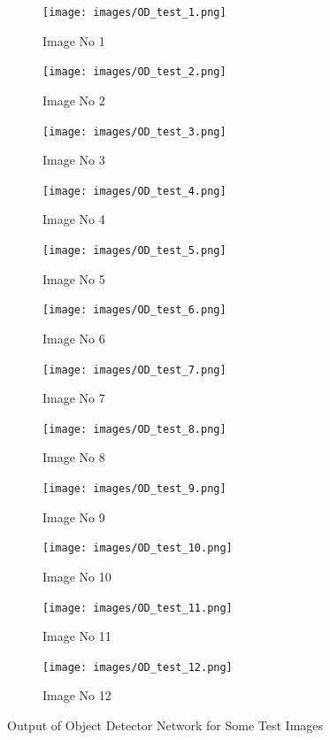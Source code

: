 \documentclass[a4paper, openany]{book}
\begin{document}
\begin{figure}[ht]
  \centering
  \begin{subfigure}[b]{0.3\linewidth}
    \texttt{[image: images/OD\_test\_1.png]}
    \caption{Image No 1}
  \end{subfigure}
  \begin{subfigure}[b]{0.3\linewidth}
    \texttt{[image: images/OD\_test\_2.png]}
    \caption{Image No 2}
  \end{subfigure}
    \begin{subfigure}[b]{0.3\linewidth}
    \texttt{[image: images/OD\_test\_3.png]}
    \caption{Image No 3}
  \end{subfigure}
  \begin{subfigure}[b]{0.3\linewidth}
    \texttt{[image: images/OD\_test\_4.png]}
    \caption{Image No 4}
  \end{subfigure}
  \begin{subfigure}[b]{0.3\linewidth}
    \texttt{[image: images/OD\_test\_5.png]}
    \caption{Image No 5}
  \end{subfigure}
    \begin{subfigure}[b]{0.3\linewidth}
    \texttt{[image: images/OD\_test\_6.png]}
    \caption{Image No 6}
  \end{subfigure}
  \begin{subfigure}[b]{0.3\linewidth}
    \texttt{[image: images/OD\_test\_7.png]}
    \caption{Image No 7}
  \end{subfigure}
  \begin{subfigure}[b]{0.3\linewidth}
    \texttt{[image: images/OD\_test\_8.png]}
    \caption{Image No 8}
  \end{subfigure}
    \begin{subfigure}[b]{0.3\linewidth}
    \texttt{[image: images/OD\_test\_9.png]}
    \caption{Image No 9}
  \end{subfigure}
  \begin{subfigure}[b]{0.3\linewidth}
    \texttt{[image: images/OD\_test\_10.png]}
    \caption{Image No 10}
  \end{subfigure}
  \begin{subfigure}[b]{0.3\linewidth}
    \texttt{[image: images/OD\_test\_11.png]}
    \caption{Image No 11}
  \end{subfigure}
    \begin{subfigure}[b]{0.3\linewidth}
    \texttt{[image: images/OD\_test\_12.png]}
    \caption{Image No 12}
  \end{subfigure}
  \caption{Output of Object Detector Network for Some Test Images}
  \label{fig:OD_t_images}
\end{figure}
\end{document}

